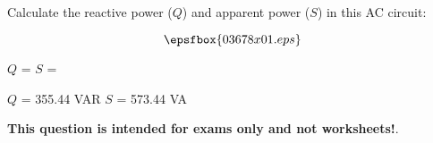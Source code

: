 

Calculate the reactive power ($Q$) and apparent power ($S$) in this AC circuit:

$$\epsfbox{03678x01.eps}$$

$Q$ = \hskip 150pt $S$ = 







$Q$ = 355.44 VAR \hskip 100pt $S$ = 573.44 VA







{\bf This question is intended for exams only and not worksheets!}.



